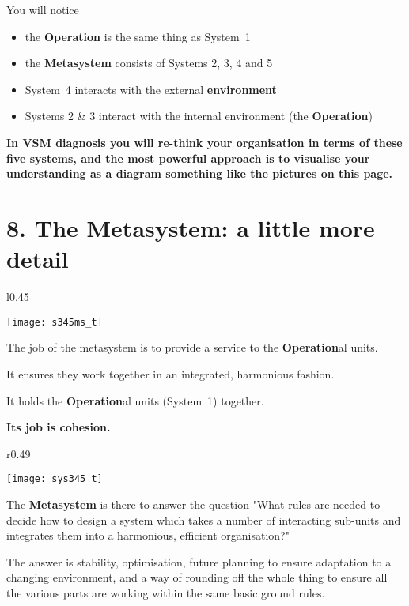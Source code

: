 You will notice
\begin{itemize}
	\item the \textcolor{O}{\textbf{Operation}} is the same thing as System 1
	\item the \textcolor{M}{\textbf{Metasystem}} consists of Systems 2, 3, 4 and 5
	\item System 4 interacts with the external \textcolor{E}{\textbf{environment}}
	\item Systems 2 \& 3 interact with the internal environment (the \textcolor{O}{\textbf{Operation}})
\end{itemize}


\textbf{In VSM diagnosis you will re-think your organisation in terms of these five systems, and the most powerful approach is to visualise your understanding as a diagram something like the pictures on this page.}

\section*{8. The \textcolor{M}{\textbf{Metasystem}}: a little more detail}
\begin{wrapfigure}[9]{l}{0.45\textwidth}
    \begin{center}
        \texttt{[image: s345ms\_t]}
    \end{center}
\end{wrapfigure}
The job of the metasystem is to provide a service to the \textcolor{O}{\textbf{Operation}}al units.

It ensures they work together in an integrated, harmonious fashion.

It holds the \textcolor{O}{\textbf{Operation}}al units (System 1) together.

\textbf{Its job is cohesion.}
\vspace{2cm}

\begin{wrapfigure}[15]{r}{0.49\textwidth}
    \begin{center}
        \texttt{[image: sys345\_t]}
    \end{center}
\end{wrapfigure}

The \textcolor{M}{\textbf{Metasystem}} is there to answer the question "What rules are needed to decide how to design a system which takes a number of interacting sub-units and integrates them into a harmonious, efficient organisation?"

The answer is stability, optimisation, future planning to ensure adaptation to a changing environment, and a way of rounding off the whole thing to ensure all the various parts are working within the same basic ground rules.

